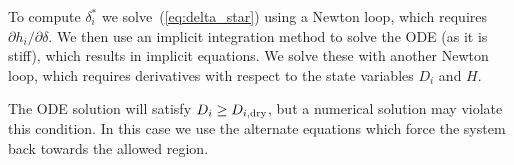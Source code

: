 \documentclass{article}
\begin{document}
To compute $\delta_i^*$ we solve~(\ref{eq:delta_star}) using a Newton
loop, which requires $\partial h_i/\partial \delta$. We then use an
implicit integration method to solve the ODE (as it is stiff), which
results in implicit equations. We solve these with another Newton
loop, which requires derivatives with respect to the state variables
$D_i$ and $H$.

The ODE solution will satisfy $D_i \ge D_{i,\rm dry}$, but a numerical
solution may violate this condition. In this case we use the alternate
equations which force the system back towards the allowed region.
\end{document}
